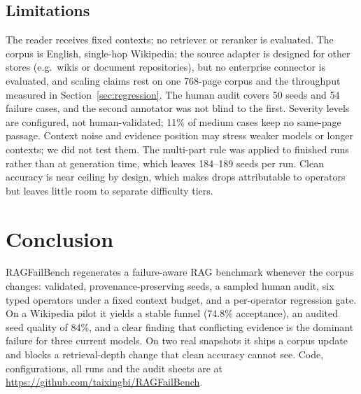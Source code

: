 \documentclass[conference]{IEEEtran}
\newcommand{\op}[1]{\texttt{\detokenize{#1}}}
\begin{document}
\subsection{Limitations}
The reader receives fixed contexts; no retriever or reranker is evaluated. The corpus is
English, single-hop Wikipedia; the source adapter is designed for other stores (e.g.\ wikis or
document repositories), but no enterprise connector is evaluated, and scaling claims rest on one
768-page corpus and the throughput measured in Section~\ref{sec:regression}. The human audit
covers 50 seeds and 54 failure cases, and the second annotator was not blind to the first.
Severity levels are configured, not human-validated; 11\% of medium \op{missing_evidence} cases
keep no same-page passage. Context noise and evidence position may stress weaker models or
longer contexts; we did not test them. The multi-part rule was applied to finished runs rather
than at generation time, which leaves 184--189 seeds per run. Clean accuracy is near ceiling by
design, which makes drops attributable to operators but leaves little room to separate
difficulty tiers.

\section{Conclusion}
RAGFailBench regenerates a failure-aware RAG benchmark whenever the corpus changes: validated,
provenance-preserving seeds, a sampled human audit, six typed operators under a fixed context
budget, and a per-operator regression gate. On a Wikipedia pilot it yields a stable funnel
(74.8\% acceptance), an audited seed quality of 84\%, and a clear finding that conflicting
evidence is the dominant failure for three current models. On two real snapshots it ships a
corpus update and blocks a retrieval-depth change that clean accuracy cannot see. Code,
configurations, all runs and the audit sheets are at
\url{https://github.com/taixingbi/RAGFailBench}.
\end{document}
